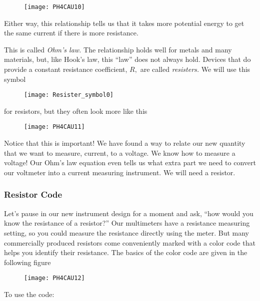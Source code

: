 \begin{figure}[h!]
	\centering
	\texttt{[image: PH4CAU10]}
\end{figure}

Either way, this relationship tells us that it takes more potential energy to get the same current if there is more resistance.

This is called \emph{Ohm's law.} The relationship holds well for metals and many materials, but, like Hook's law, this ``law'' does not always hold. Devices that do provide a constant resistance coefficient, $R,$ are called \emph{resisters.} We will use this symbol

\begin{figure}[h!]
	\centering
    \texttt{[image: Resister\_symbol0]}
\end{figure}

for resistors, but they often look more like this

\begin{figure}[h!]
	\centering
    \texttt{[image: PH4CAU11]}
\end{figure}

Notice that this is important! We have found a way to relate our new quantity that we want to measure, current, to a voltage. We know how to measure a voltage! Our Ohm's law equation even tells us what extra part we need to convert our voltmeter into a current measuring instrument. We will need a resistor.

\subsubsection{Resistor Code}

Let's pause in our new instrument design for a moment and ask, ``how would you know the resistance of a resistor?'' Our multimeters have a resistance measuring setting, so you could measure the resistance directly using the meter. But many commercially produced resistors come conveniently marked with a color code that helps you identify their resistance. The basics of the color code are given in the following figure\bigskip 

\begin{figure}[h!]
	\centering
    \texttt{[image: PH4CAU12]}
\end{figure}

To use the code:

